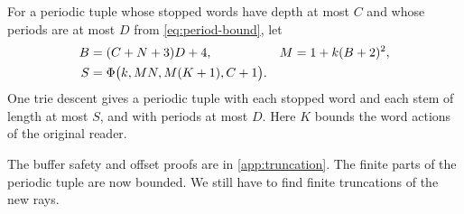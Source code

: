 \begin{lemma}\label{lem:buffered}
For a periodic tuple whose stopped words have depth at most $C$ and whose
periods are at most $D$ from \eqref{eq:period-bound}, let
\begin{align*}
  B&=(C+N+3)D+4, & M&=1+k(B+2)^2,\\
  S&=\Phi\bigl(k,MN,M(K+1),C+1\bigr).
\end{align*}
One trie descent gives a periodic tuple with each stopped word and each
stem of length at most $S$, and with periods at most $D$.
Here $K$ bounds the word actions of the original reader.
\end{lemma}

The buffer safety and offset proofs are in \cref{app:truncation}.
The finite parts of the periodic tuple are now bounded.
We still have to find finite truncations of the new rays.

